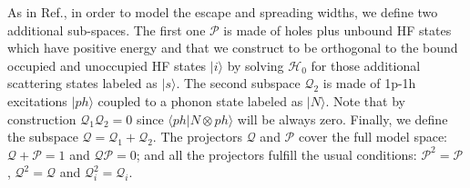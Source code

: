 \documentclass[12pt,a4paper,final]{iopart}
\begin{document}

As in Ref.\cite{colo1994}, in order to model the escape and spreading widths, we define two additional sub-spaces. The first one $\mathcal{P}$ is made of holes plus unbound HF states which have positive energy and that we construct to be orthogonal to the bound occupied and unoccupied HF states $\vert i\rangle$ by solving $\mathcal{H}_0$ for those additional scattering states labeled as $\vert s\rangle$. The second subspace $\mathcal{Q}_2$ is made of 1p-1h excitations $\vert ph\rangle$ coupled to a phonon state labeled as $\vert N\rangle$. Note that by construction $\mathcal{Q}_1\mathcal{Q}_2=0$ since $\langle ph\vert N\otimes ph\rangle$ will be always zero. Finally, we define the subspace $\mathcal{Q}=\mathcal{Q}_1+\mathcal{Q}_2$. The projectors $\mathcal{Q}$ and $\mathcal{P}$ cover the full model space: $\mathcal{Q+P}=1$ and $\mathcal{Q}\mathcal{P}=0$; and all the projectors fulfill the usual conditions: $\mathcal{P}^2=\mathcal{P}$, $\mathcal{Q}^2=\mathcal{Q}$ and $\mathcal{Q}_i^2=\mathcal{Q}_i$. 
\end{document}
